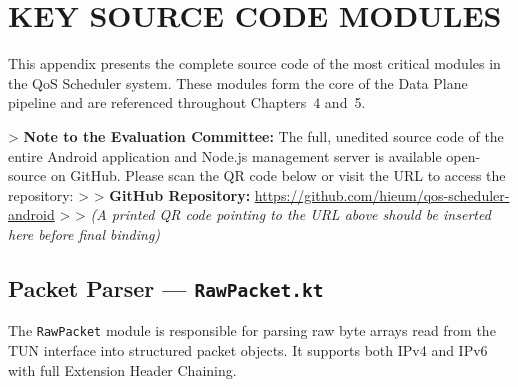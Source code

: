
\chapter{KEY SOURCE CODE MODULES}
\label{app:source_code}

This appendix presents the complete source code of the most critical modules in the QoS Scheduler system. These modules form the core of the Data Plane pipeline and are referenced throughout Chapters~4 and~5.

> \textbf{Note to the Evaluation Committee:} The full, unedited source code of the entire Android application and Node.js management server is available open-source on GitHub. Please scan the QR code below or visit the URL to access the repository:
> 
> \textbf{GitHub Repository:} \url{https://github.com/hieum/qos-scheduler-android}
>
> \textit{(A printed QR code pointing to the URL above should be inserted here before final binding)}


\section{Packet Parser --- \texttt{RawPacket.kt}}
\label{app:rawpacket}

The \texttt{RawPacket} module is responsible for parsing raw byte arrays read from the TUN interface into structured packet objects. It supports both IPv4 and IPv6 with full Extension Header Chaining.

